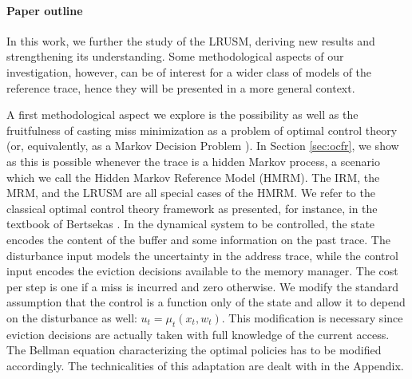 \documentclass[11pt,a4paper]{article}
\theoremstyle{definition}
\theoremstyle{remark}
\begin{document}
\paragraph{Paper outline} In this work, we further the study of the
LRUSM, deriving new results and strengthening its understanding. Some
methodological aspects of our investigation, however, can be of
interest for a wider class of models of the reference trace, hence
they will be presented in a more general context.

A first methodological aspect we explore is the possibility as well as
the fruitfulness of casting miss minimization as a problem of optimal
control theory (or, equivalently, as a Markov Decision Problem
\cite{LewisP02}).  In Section \ref{sec:ocfr}, we show as this is
possible whenever the trace is a hidden Markov process, a scenario
which we call the Hidden Markov Reference Model (HMRM). The IRM, the
MRM, and the LRUSM are all special cases of the HMRM.  We refer to the
classical optimal control theory framework as presented, for instance,
in the textbook of Bertsekas \cite{Bertsekas00}.  In the dynamical
system to be controlled, the state encodes the content of the buffer
and some information on the past trace.  The disturbance input models
the uncertainty in the address trace, while the control input encodes
the eviction decisions available to the memory manager. The cost per
step is one if a miss is incurred and zero otherwise.  We modify the
standard assumption that the control is a function only of the state
and allow it to depend on the disturbance as well:
$u_t=\mu_t(x_t,w_t)$.  This modification is necessary since eviction
decisions are actually taken with full knowledge of the current
access.  The Bellman equation characterizing the optimal policies has
to be modified accordingly. The technicalities of this adaptation are
dealt with in the Appendix.
\end{document}
